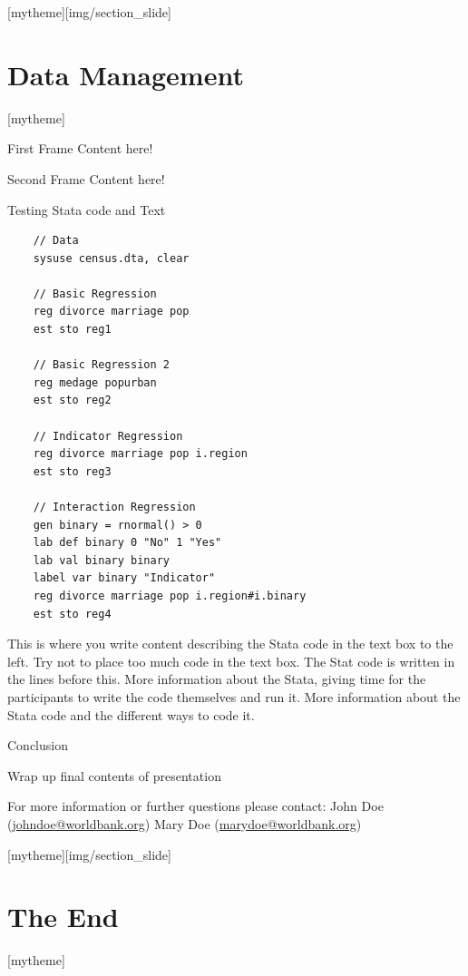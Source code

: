 \documentclass[aspectratio=169]{beamer}
\newcommand{\sectionpic}[2]{
	\setbeamertemplate{section page}[mytheme][#2]
	\section{#1}
	\setbeamertemplate{section page}[mytheme]
}
\begin{document}
\sectionpic{Data Management}{img/section_slide}

\begin{frame}{First Frame}
Content here!
\end{frame}


\begin{frame}{Second Frame}
Content here!
\end{frame}

\begin{frame}[fragile]{Testing Stata code and Text}
\begin{multicols}{2}
	\begin{lstlisting}
	// Data
	sysuse census.dta, clear
	
	// Basic Regression
	reg divorce marriage pop
	est sto reg1
	
	// Basic Regression 2
	reg medage popurban
	est sto reg2
	
	// Indicator Regression
	reg divorce marriage pop i.region
	est sto reg3
	
	// Interaction Regression
	gen binary = rnormal() > 0
	lab def binary 0 "No" 1 "Yes"
	lab val binary binary
	label var binary "Indicator"
	reg divorce marriage pop i.region#i.binary
	est sto reg4
	\end{lstlisting}
	\parbox{\linewidth}{
		This is where you write content describing the Stata code in the text box to the left. Try not to place too much code in the text box. The Stat code is written in the lines before this.
		\newline \newline
		More information about the Stata, giving time for the participants to write the code themselves and run it.
		\newline \newline
		More information about the Stata code and the different ways to code it.
	}
\end{multicols}
\end{frame}

\begin{frame}{Conclusion}

Wrap up final contents of presentation

\vspace{20mm}
For more information or further questions please contact:
\newline John Doe (\url{johndoe@worldbank.org}) \newline Mary Doe (\url{marydoe@worldbank.org})

\end{frame}

\sectionpic{The End}{img/section_slide}
\end{document}
